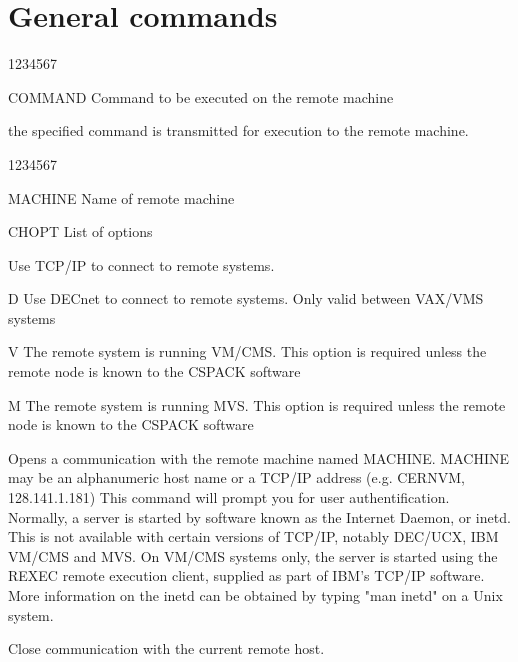 \section{General commands}
\begin{DLtt}{1234567}
\item[COMMAND]Command to be executed on the remote machine
\end{DLtt}
the specified command is transmitted for execution to the
remote machine.

\begin{DLtt}{1234567}
\item[MACHINE]Name of remote machine
\item[CHOPT]List of options
\begin{DLtt}{12}
\item[ ]Use TCP/IP to connect to remote systems.
\item[D]Use DECnet to connect to remote systems. Only valid between
VAX/VMS systems
\item[V]The remote system is running VM/CMS. This option is required
unless the remote node is known to the CSPACK software
\item[M]The remote system is running MVS. This option is required
unless the remote node is known to the CSPACK software
\end{DLtt}
\end{DLtt}
Opens a communication with the remote machine named MACHINE.
MACHINE may be an alphanumeric host name or a TCP/IP address
(e.g. CERNVM, 128.141.1.181)
This command will prompt you for user authentification.
Normally, a server is started by software known as the Internet
Daemon, or inetd. This is not available with certain versions
of TCP/IP, notably DEC/UCX, IBM VM/CMS and MVS. On VM/CMS systems
only, the server is started using the REXEC remote execution
client, supplied as part of IBM's TCP/IP software. More
information on the inetd can be obtained by typing "man inetd"
on a Unix system.

Close communication with the current remote host.

